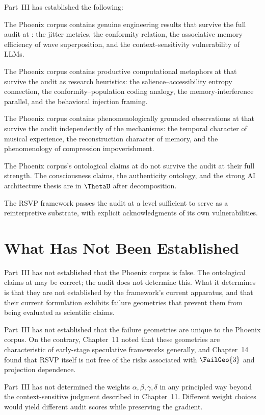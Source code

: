 Part~III has established the following:

The Phoenix corpus contains genuine engineering results
that survive the full audit at \LevelI{}: the jitter
metrics, the conformity relation, the associative
memory efficiency of wave superposition, and the
context-sensitivity vulnerability of LLMs.

The Phoenix corpus contains productive computational
metaphors at \LevelII{} that survive the audit as
research heuristics: the salience--accessibility
entropy connection, the conformity--population coding
analogy, the memory-interference parallel, and the
behavioral injection framing.

The Phoenix corpus contains phenomenologically grounded
observations at \LevelIII{} that survive the audit
independently of the mechanisms: the temporal character
of musical experience, the reconstruction character
of memory, and the phenomenology of compression
impoverishment.

The Phoenix corpus's ontological claims at \LevelIV{}
do not survive the audit at their full strength.
The consciousness claims, the authenticity ontology,
and the strong AI architecture thesis are in $\ThetaU$
after decomposition.

The RSVP framework passes the audit at a level
sufficient to serve as a reinterpretive substrate,
with explicit acknowledgments of its own vulnerabilities.

\section{What Has Not Been Established}
\label{sec:what-not-established}

Part~III has not established that the Phoenix corpus
is false. The ontological claims at \LevelIV{} may
be correct; the audit does not determine this. What
it determines is that they are not established by
the framework's current apparatus, and that their
current formulation exhibits failure geometries
that prevent them from being evaluated as scientific
claims.

Part~III has not established that the failure geometries
are unique to the Phoenix corpus. On the contrary,
Chapter~11 noted that these geometries are characteristic
of early-stage speculative frameworks generally, and
Chapter~14 found that RSVP itself is not free of
the risks associated with $\FailGeo{3}$ and
projection dependence.

Part~III has not determined the weights
$\alpha, \beta, \gamma, \delta$ in any principled
way beyond the context-sensitive judgment described
in Chapter~11. Different weight choices would yield
different audit scores while preserving the gradient.

